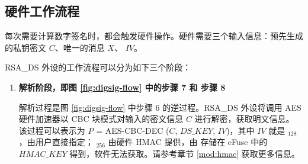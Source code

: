 \documentclass[main\_\_CN.tex]{subfiles}
\begin{document}
\subsection{硬件工作流程}
\label{sec:digsig-hardware-level-operation}

每次需要计算数字签名时，都会触发硬件操作。硬件需要三个输入信息：预先生成的私钥密文 \begin{math}C\end{math}、唯一的消息 \begin{math}X\end{math}、 \begin{math}IV\end{math}。

RSA\_DS 外设的工作流程可以分为如下三个阶段：

\begin{enumerate}  

    \item {\bfseries 解析阶段，即图 \ref{fig:digsig-flow} 中的步骤 7 和 步骤 8}
    
        解析过程是图 \ref{fig:digsig-flow} 中步骤 6 的逆过程。RSA\_DS 外设将调用 AES 硬件加速器以 CBC 块模式对输入的密文信息 \begin{math}C\end{math} 进行解密，获取明文信息。
        该过程可以表示为
        \begin{math}P\end{math} = AES-CBC-DEC (\begin{math}C\end{math}, \begin{math}DS\_KEY\end{math}, \begin{math}IV\end{math})，其中 \begin{math}IV\end{math} 就是 \begin{math}[IV]_{128}\end{math}，由用户直接指定； \begin{math}[DS\_KEY]_{256}\end{math} 由硬件 HMAC 提供，由 存储在 eFuse 中的 \begin{math}HMAC\_KEY\end{math} 得到，软件无法获取。请参考章节 \ref{mod:hmac} \textit{} 获取更多信息。
        

\end{enumerate}
\end{document}
